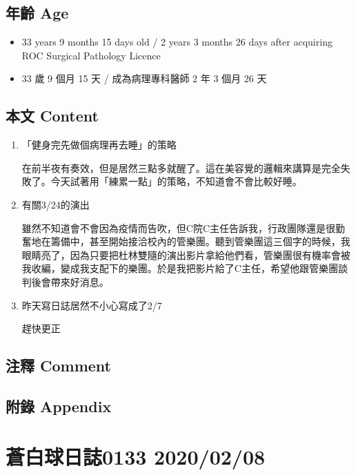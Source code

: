 \documentclass[
]{article}
\providecommand{\tightlist}{%
  \setlength{\itemsep}{0pt}\setlength{\parskip}{0pt}}
\begin{document}
\hypertarget{ux5e74ux9f61-age-6}{%
\subsection{年齡 Age}\label{ux5e74ux9f61-age-6}}

\begin{itemize}
\tightlist
\item
  33 years 9 months 15 days old / 2 years 3 months 26 days after
  acquiring ROC Surgical Pathology Licence
\item
  33 歲 9 個月 15 天 / 成為病理專科醫師 2 年 3 個月 26 天
\end{itemize}

\hypertarget{ux672cux6587-content-6}{%
\subsection{本文 Content}\label{ux672cux6587-content-6}}

\begin{enumerate}
\def\labelenumi{\arabic{enumi}.}
\item
  「健身完先做個病理再去睡」的策略

  在前半夜有奏效，但是居然三點多就醒了。這在美容覺的邏輯來講算是完全失敗了。今天試著用「練累一點」的策略，不知道會不會比較好睡。
\item
  有關3/24的演出

  雖然不知道會不會因為疫情而告吹，但C院C主任告訴我，行政團隊還是很勤奮地在籌備中，甚至開始接洽校內的管樂團。聽到管樂團這三個字的時候，我眼睛亮了，因為只要把杜林雙隨的演出影片拿給他們看，管樂團很有機率會被我收編，變成我支配下的樂團。於是我把影片給了C主任，希望他跟管樂團談判後會帶來好消息。
\item
  昨天寫日誌居然不小心寫成了2/7

  趕快更正
\end{enumerate}

\hypertarget{ux6ce8ux91cb-comment-6}{%
\subsection{注釋 Comment}\label{ux6ce8ux91cb-comment-6}}

\hypertarget{ux9644ux9304-appendix-6}{%
\subsection{附錄 Appendix}\label{ux9644ux9304-appendix-6}}

\hypertarget{ux84bcux767dux7403ux65e5ux8a8c0133-20200208}{%
\section{蒼白球日誌0133
2020/02/08}\label{ux84bcux767dux7403ux65e5ux8a8c0133-20200208}}
\end{document}
